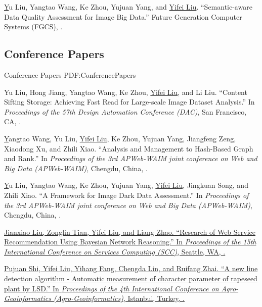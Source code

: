 \documentclass[letterpaper,10pt,oneside]{article}
\begin{document}
\begin{body}
\BigGap
\NumberedItem{[2]}
\href{https://www.sciencedirect.com/science/article/pii/S0167739X19302304}
Yu Liu, Yangtao Wang, Ke Zhou, Yujuan Yang, and \underline{Yifei Liu}.
``Semantic-aware Data Quality Assessment for Image Big Data.'' 
Future Generation Computer Systems (FGCS),
.
\BigGap
\GapNoBreak

\subsection
{Conference Papers}
{Conference Papers}
{PDF:ConferencePapers}
\GapNoBreak

\NumberedItem{[1]}
Yu Liu, Hong Jiang, Yangtao Wang, Ke Zhou, \underline{Yifei Liu}, and Li Liu.
``Content Sifting Storage: Achieving Fast Read for Large-scale Image Dataset Analysis.''
In \textit{Proceedings of the 57th Design Automation Conference (DAC)}, San Francisco, CA,
.

\BigGap
\NumberedItem{[2]}
\href{https://link.springer.com/chapter/10.1007/978-3-030-26072-9_22}
Yangtao Wang, Yu Liu, \underline{Yifei Liu}, Ke Zhou, Yujuan Yang, Jiangfeng Zeng, Xiaodong Xu, and Zhili Xiao.
``Analysis and Management to Hash-Based Graph and Rank.''
In \textit{Proceedings of the 3rd APWeb-WAIM joint conference on Web and Big Data (APWeb-WAIM)}, Chengdu, China,
.

\BigGap
\NumberedItem{[3]}
\href{https://link.springer.com/chapter/10.1007/978-3-030-26072-9_1}
Yu Liu, Yangtao Wang, Ke Zhou, Yujuan Yang, \underline{Yifei Liu}, Jingkuan Song, and Zhili Xiao.
``A Framework for Image Dark Data Assessment.''
In \textit{Proceedings of the 3rd APWeb-WAIM joint conference on Web and Big Data (APWeb-WAIM)}, Chengdu, China,
.

\BigGap
\NumberedItem{[4]}
\href{https://link.springer.com/chapter/10.1007/978-3-319-94376-3_2}
{Jianxiao Liu, Zonglin Tian, \underline{Yifei Liu}, and Liang Zhao.
``Research of Web Service Recommendation Using Bayesian Network Reasoning.''
In \textit{Proceedings of the 15th International Conference on Services Computing (SCC)},
Seattle, WA,
.}

\BigGap
\NumberedItem{[5]}
\href{https://ieeexplore.ieee.org/abstract/document/7248122/}
{Pujuan Shi, \underline{Yifei Liu}, Yihang Fang, Chengda Lin, and Ruifang Zhai.
``A new line detection algorithm - Automatic measurement of character parameter of rapeseed plant by LSD.''
In \textit{Proceedings of the 4th International Conference on Agro-Geoinformatics (Agro-Geoinformatics)},
Istanbul, Turkey,
.}
\BigGap
\GapNoBreak


\end{body}
\end{document}
